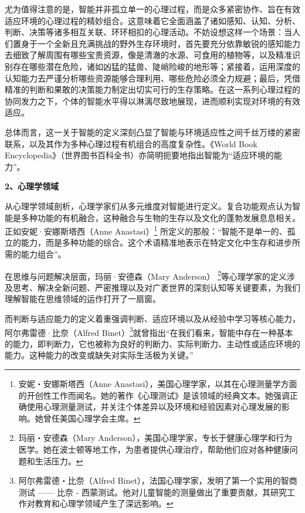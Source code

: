 尤为值得注意的是，智能并非孤立单一的心理过程，而是众多紧密协作、旨在有效适应环境的心理过程的精妙组合。这意味着它全面涵盖了诸如感知、认知、分析、判断、决策等诸多相互关联、环环相扣的心理活动。不妨设想这样一个场景：当人们置身于一个全新且充满挑战的野外生存环境时，首先要充分依靠敏锐的感知能力去细致了解周围有哪些宝贵资源，像是清澈的水源、可食用的植物等，以及精准识别存在哪些潜在危险，诸如凶猛的猛兽、陡峭险峻的地形等；紧接着，运用深度的认知能力去严谨分析哪些资源能够合理利用、哪些危险必须全力规避；最后，凭借精准的判断和果敢的决策能力制定出切实可行的生存策略。在这一系列心理过程的协同发力之下，个体的智能水平得以淋漓尽致地展现，进而顺利实现对环境的有效适应。

总体而言，这一关于智能的定义深刻凸显了智能与环境适应性之间千丝万缕的紧密联系，以及其作为多种心理过程有机组合的高度复杂性。《World Book Encyclopedia》（世界图书百科全书）亦简明扼要地指出智能为“适应环境的能力”。

\textbf{2、心理学领域}


从心理学领域剖析，心理学家们从多元维度对智能进行定义。复合功能观点认为智能是多种功能的有机融合，这种融合与生物的生存以及文化的蓬勃发展息息相关。正如安妮·安娜斯塔西（Anne Anastasi）\footnote{安妮・安娜斯塔西（Anne Anastasi），美国心理学家，以其在心理测量学方面的开创性工作而闻名。她的著作《心理测试》是该领域的经典文本。她强调正确使用心理测量测试，并关注个体差异以及环境和经验因素对心理发展的影响。她曾任美国心理学会主席。} 所定义的那般：“智能不是单一的、孤立的能力，而是多种功能的综合。这个术语精准地表示在特定文化中生存和进步所需的能力组合”。

在思维与问题解决层面，玛丽·安德森（Mary Anderson） \footnote{玛丽・安德森（Mary Anderson），美国心理学家，专长于健康心理学和行为医学。她在波士顿等地工作，为患者提供心理治疗，帮助他们应对各种健康问题和生活压力。}等心理学家的定义涉及思考、解决全新问题、严密推理以及对广袤世界的深刻认知等关键要素，为我们理解智能在思维领域的运作打开了一扇窗。

而判断与适应能力的定义着重强调判断、适应环境以及从经验中学习等核心能力，阿尔弗雷德·比奈（Alfred Binet）\footnote{阿尔弗雷德・比奈（Alfred Binet），法国心理学家，发明了第一个实用的智商测试 —— 比奈 - 西蒙测试。他对儿童智能的测量做出了重要贡献，其研究工作对教育和心理学领域产生了深远影响。}就曾指出“在我们看来，智能中存在一种基本的能力，即判断力，它也被称为良好的判断力、实际判断力、主动性或适应环境的能力。这种能力的改变或缺失对实际生活极为关键。”

